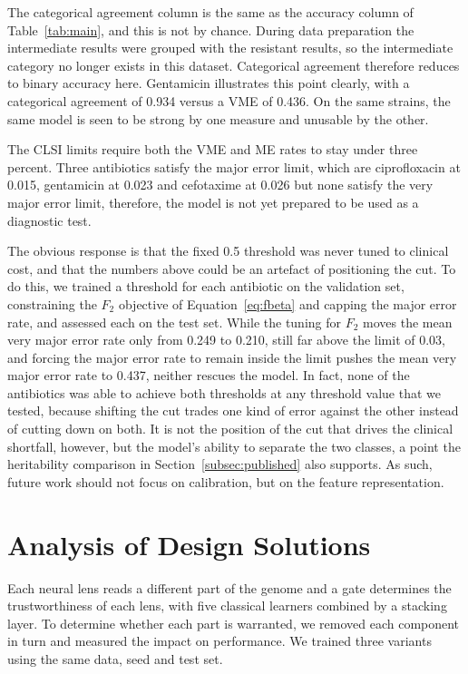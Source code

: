 The categorical agreement column is the same as the accuracy column of
Table~\ref{tab:main}, and this is not by chance. During data preparation
the intermediate results were grouped with the resistant results, so the
intermediate category no longer exists in this dataset. Categorical
agreement therefore reduces to binary accuracy here.
Gentamicin illustrates this point clearly, with a categorical agreement of 0.934 versus
a VME of 0.436. On the same strains, the same model is seen to be strong by
one measure and unusable by the other.

\vspace{1em}

The CLSI limits require both the VME and ME rates to stay under three
percent. Three antibiotics satisfy the major error limit, which are
ciprofloxacin at 0.015, gentamicin at 0.023 and cefotaxime at 0.026 but none
satisfy the very major error limit, therefore, the model is not yet prepared
to be used as a diagnostic test.

\vspace{1em}

The obvious response is that the fixed 0.5 threshold was never tuned to
clinical cost, and that the numbers above could be an artefact of positioning
the cut. To do this, we trained a threshold for each antibiotic on the
validation set, constraining the $F_2$ objective of Equation~\eqref{eq:fbeta}
and capping the major error rate, and assessed each on the test set. While the
tuning for $F_2$ moves the mean very major error rate only from 0.249 to
0.210, still far above the limit of 0.03, and forcing the major error rate to
remain inside the limit pushes the mean very major error rate to 0.437,
neither rescues the model. In fact, none of the antibiotics was able to achieve both
thresholds at any threshold value that we tested, because shifting the cut
trades one kind of error against the other instead of
cutting down on both. It is not the position of the cut that drives the clinical
shortfall, however, but the model's ability to separate the two classes, a point
the heritability comparison in Section~\ref{subsec:published} also supports. As
such, future work should not focus on calibration, but on the feature
representation.

\FloatBarrier
\section{Analysis of Design Solutions}
\label{subsec:layerabl}

Each neural lens reads a different part of the genome and a gate determines
the trustworthiness of each lens, with five classical learners combined by a
stacking layer. To determine whether each part is warranted, we removed each
component in turn and measured the impact on performance. We trained three variants using the same data,
seed and test set.

